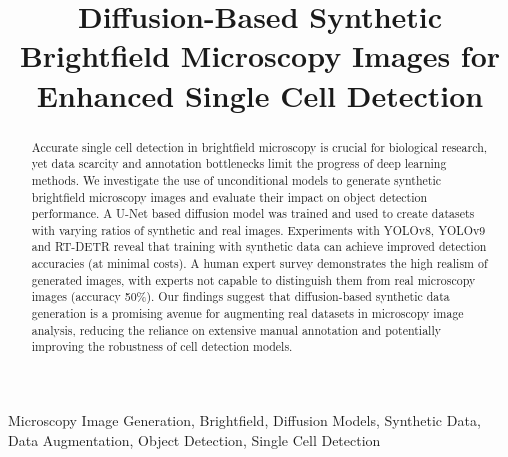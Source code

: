 \documentclass[conference,a4paper]{IEEEtran}
\begin{document}
\title{Diffusion-Based Synthetic Brightfield Microscopy Images for Enhanced Single Cell Detection}


\maketitle

\begin{abstract}
    Accurate single cell detection in brightfield microscopy is crucial for biological research, yet data scarcity and annotation bottlenecks limit the progress of deep learning methods.
    We investigate the use of unconditional models to generate synthetic brightfield microscopy images and evaluate their impact on object detection performance.
    A U-Net based diffusion model was trained and used to create datasets with varying ratios of synthetic and real images.
    Experiments with YOLOv8, YOLOv9 and RT-DETR reveal that training with synthetic data can achieve improved detection accuracies (at minimal costs).
    A human expert survey demonstrates the high realism of generated images, with experts not capable to distinguish them from real microscopy images (accuracy 50\%).
    Our findings suggest that diffusion-based synthetic data generation is a promising avenue for augmenting real datasets in microscopy image analysis, reducing the reliance on extensive manual annotation and potentially improving the robustness of cell detection models.
\end{abstract}

\begin{IEEEkeywords}
Microscopy Image Generation, Brightfield, Diffusion Models, Synthetic Data, Data Augmentation, Object Detection, Single Cell Detection
\end{IEEEkeywords}








{
    \small
    
    
}
\end{document}
